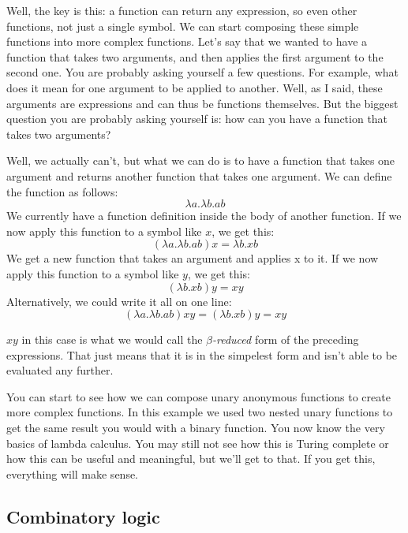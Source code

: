 \documentclass[a4paper, 11pt]{article}
\begin{document}
Well, the key is this: a function can return any expression, so even other
functions, not just a single symbol. We can start composing these simple
functions into more complex functions. Let's say that we wanted to have a
function that takes two arguments, and then applies the first argument to the
second one. You are probably asking yourself a few questions. For example, what
does it mean for one argument to be applied to another. Well, as I said, these
arguments are expressions and can thus be functions themselves. But the biggest
question you are probably asking yourself is: how can you have a function that
takes two arguments?

Well, we actually can't, but what we can do is to have a function that takes
one argument and returns another function that takes one argument. We can
define the function as follows:
\[\lambda a.\lambda b.ab\]
We currently have a function definition inside the body of another function. If
we now apply this function to a symbol like \(x\), we get this:
\[(\lambda a.\lambda b.ab)x=\lambda b.xb\]
We get a new function that takes an argument and applies x to it. If we now
apply this function to a symbol like \(y\), we get this:
\[(\lambda b.xb)y=xy\]
Alternatively, we could write it all on one line:
\[(\lambda a.\lambda b.ab)xy=(\lambda b.xb)y=xy\]

\(xy\) in this case is what we would call the \emph{\(\beta\)-reduced} form of the
preceding expressions. That just means that it is in the simpelest form and
isn't able to be evaluated any further.

You can start to see how we can compose unary anonymous functions to create
more complex functions. In this example we used two nested unary functions to
get the same result you would with a binary function. You now know the very
basics of lambda calculus. You may still not see how this is Turing complete or
how this can be useful and meaningful, but we'll get to that. If you get this,
everything will make sense.


\subsection{Combinatory logic}

\end{document}
